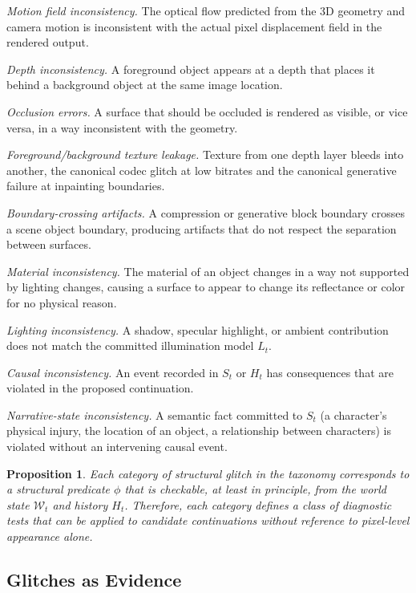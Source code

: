 \documentclass[12pt,a4paper]{article}
\theoremstyle{plain}
\newtheorem{proposition}[theorem]{Proposition}
\theoremstyle{definition}
\theoremstyle{remark}
\begin{document}
\textit{Motion field inconsistency.} The optical flow predicted from the 3D geometry and camera motion is inconsistent with the actual pixel displacement field in the rendered output.

\textit{Depth inconsistency.} A foreground object appears at a depth that places it behind a background object at the same image location.

\textit{Occlusion errors.} A surface that should be occluded is rendered as visible, or vice versa, in a way inconsistent with the geometry.

\textit{Foreground/background texture leakage.} Texture from one depth layer bleeds into another, the canonical codec glitch at low bitrates and the canonical generative failure at inpainting boundaries.

\textit{Boundary-crossing artifacts.} A compression or generative block boundary crosses a scene object boundary, producing artifacts that do not respect the separation between surfaces.

\textit{Material inconsistency.} The material of an object changes in a way not supported by lighting changes, causing a surface to appear to change its reflectance or color for no physical reason.

\textit{Lighting inconsistency.} A shadow, specular highlight, or ambient contribution does not match the committed illumination model $L_t$.

\textit{Causal inconsistency.} An event recorded in $S_t$ or $H_t$ has consequences that are violated in the proposed continuation.

\textit{Narrative-state inconsistency.} A semantic fact committed to $S_t$ (a character's physical injury, the location of an object, a relationship between characters) is violated without an intervening causal event.

\begin{proposition}
Each category of structural glitch in the taxonomy corresponds to a structural predicate $\phi$ that is checkable, at least in principle, from the world state $\mathcal{W}_t$ and history $H_t$. Therefore, each category defines a class of diagnostic tests that can be applied to candidate continuations without reference to pixel-level appearance alone.
\end{proposition}

\subsection{Glitches as Evidence}
\end{document}
